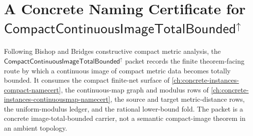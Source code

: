 \providecommand{\CompactContinuousImageTotalBoundedUp}{\mathsf{CompactContinuousImageTotalBounded}^{\uparrow}}

\chapter{A Concrete Naming Certificate for $\CompactContinuousImageTotalBoundedUp$}
\label{ch:concrete-instances-compact-continuous-image-total-bounded-namecert}

Following Bishop and Bridges constructive compact metric analysis, the $\CompactContinuousImageTotalBoundedUp$ packet records the finite theorem-facing route by which a continuous image of compact metric data becomes totally bounded. It consumes the compact finite-net surface of \autoref{ch:concrete-instances-compact-namecert}, the continuous-map graph and modulus rows of \autoref{ch:concrete-instances-continuousmap-namecert}, the source and target metric-distance rows, the uniform-modulus ledger, and the rational lower-bound fold. The packet is a concrete image-total-bounded carrier, not a semantic compact-image theorem in an ambient topology.

